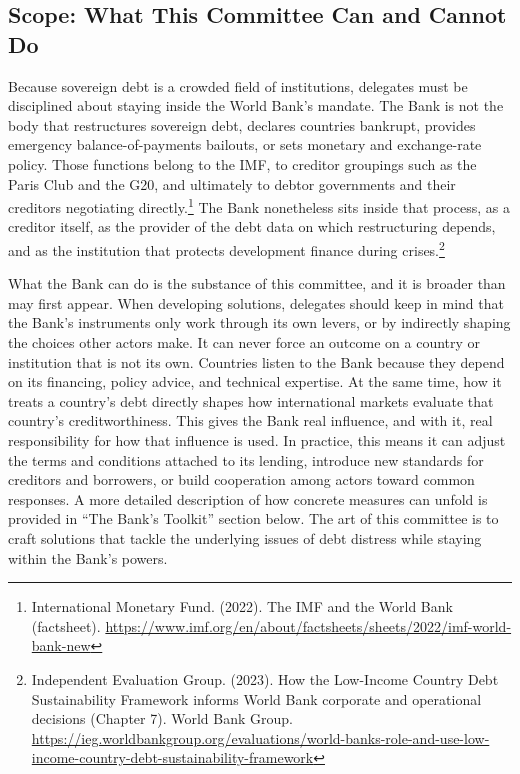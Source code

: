 \subsection{Scope: What This Committee Can and Cannot Do}

Because sovereign debt is a crowded field of institutions, delegates must be disciplined about staying inside the World Bank’s mandate. The Bank is not the body that restructures sovereign debt, declares countries bankrupt, provides emergency balance-of-payments bailouts, or sets monetary and exchange-rate policy. Those functions belong to the IMF, to creditor groupings such as the Paris Club and the G20, and ultimately to debtor governments and their creditors negotiating directly.\footnote{International Monetary Fund. (2022). The IMF and the World Bank (factsheet). \url{https://www.imf.org/en/about/factsheets/sheets/2022/imf-world-bank-new}} The Bank nonetheless sits inside that process, as a creditor itself, as the provider of the debt data on which restructuring depends, and as the institution that protects development finance during crises.\footnote{Independent Evaluation Group. (2023). How the Low-Income Country Debt Sustainability Framework informs World Bank corporate and operational decisions (Chapter 7). World Bank Group. \url{https://ieg.worldbankgroup.org/evaluations/world-banks-role-and-use-low-income-country-debt-sustainability-framework}}

What the Bank can do is the substance of this committee, and it is broader than may first appear. When developing solutions, delegates should keep in mind that the Bank’s instruments only work through its own levers, or by indirectly shaping the choices other actors make. It can never force an outcome on a country or institution that is not its own. Countries listen to the Bank because they depend on its financing, policy advice, and technical expertise. At the same time, how it treats a country’s debt directly shapes how international markets evaluate that country’s creditworthiness. This gives the Bank real influence, and with it, real responsibility for how that influence is used. In practice, this means it can adjust the terms and conditions attached to its lending, introduce new standards for creditors and borrowers, or build cooperation among actors toward common responses. A more detailed description of how concrete measures can unfold is provided in “The Bank’s Toolkit” section below. The art of this committee is to craft solutions that tackle the underlying issues of debt distress while staying within the Bank’s powers.

